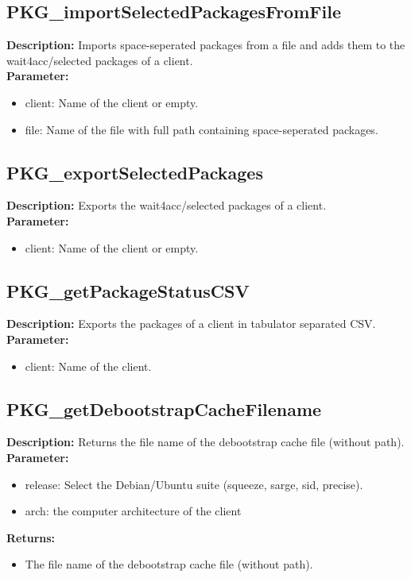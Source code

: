 \subsection{PKG\_importSelectedPackagesFromFile}
\textbf{Description:} Imports space-seperated packages from a file and adds them to the wait4acc/selected packages of a client.\\
\textbf{Parameter:}
\begin{itemize}
\item client: Name of the client or empty.
\item file: Name of the file with full path containing space-seperated packages.
\end{itemize}

\subsection{PKG\_exportSelectedPackages}
\textbf{Description:} Exports the wait4acc/selected packages of a client.\\
\textbf{Parameter:}
\begin{itemize}
\item client: Name of the client or empty.
\end{itemize}

\subsection{PKG\_getPackageStatusCSV}
\textbf{Description:} Exports the packages of a client in tabulator separated CSV.\\
\textbf{Parameter:}
\begin{itemize}
\item client: Name of the client.
\end{itemize}

\subsection{PKG\_getDebootstrapCacheFilename}
\textbf{Description:} Returns the file name of the debootstrap cache file (without path).\\
\textbf{Parameter:}
\begin{itemize}
\item release: Select the Debian/Ubuntu suite (squeeze, sarge, sid, precise).
\item arch: the computer architecture of the client
\end{itemize}
\textbf{Returns:}
\begin{itemize}
\item The file name of the debootstrap cache file (without path).
\end{itemize}

